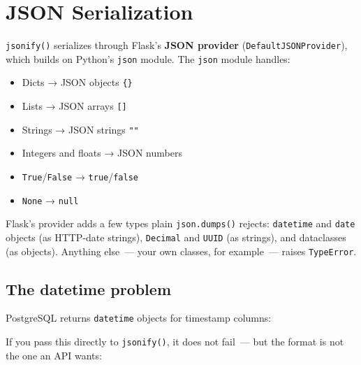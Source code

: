 \setcounter{section}{3}
\section{JSON Serialization}\label{34-response-handling:344-json-serialization}

\texttt{jsonify()} serializes through Flask's \textbf{JSON provider} (\texttt{DefaultJSONProvider}), which builds on Python's \texttt{json} module. The \texttt{json} module handles:

\begin{itemize}
\tightlist
\item
  Dicts → JSON objects \texttt{\{\}}
\item
  Lists → JSON arrays \texttt{{[}{]}}
\item
  Strings → JSON strings \texttt{""}
\item
  Integers and floats → JSON numbers
\item
  \texttt{True}/\texttt{False} → \texttt{true}/\texttt{false}
\item
  \texttt{None} → \texttt{null}
\end{itemize}

\noindent{}Flask's provider adds a few types plain \texttt{json.dumps()} rejects: \texttt{datetime} and \texttt{date} objects (as HTTP-date strings), \texttt{Decimal} and \texttt{UUID} (as strings), and dataclasses (as objects). Anything else~--- your own classes, for example~--- raises \texttt{TypeError}.

\subsection*{The datetime problem}\label{34-response-handling:the-datetime-problem}

PostgreSQL returns \texttt{datetime} objects for timestamp columns:

\begin{codebox}[short]

\begin{Shaded}
\begin{Highlighting}[]
\NormalTok{row[}\NormalTok{]  }
\end{Highlighting}
\end{Shaded}

\end{codebox}

\noindent{}If you pass this directly to \texttt{jsonify()}, it does not fail~--- but the format is not the one an API wants:

